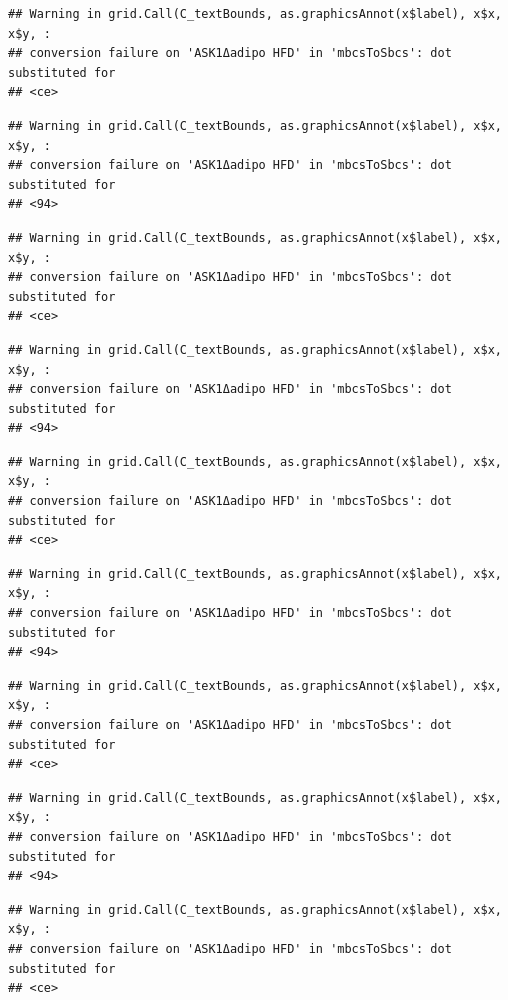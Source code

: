 \documentclass[]{book}
\begin{document}
\begin{verbatim}
## Warning in grid.Call(C_textBounds, as.graphicsAnnot(x$label), x$x, x$y, :
## conversion failure on 'ASK1Δadipo HFD' in 'mbcsToSbcs': dot substituted for
## <ce>
\end{verbatim}

\begin{verbatim}
## Warning in grid.Call(C_textBounds, as.graphicsAnnot(x$label), x$x, x$y, :
## conversion failure on 'ASK1Δadipo HFD' in 'mbcsToSbcs': dot substituted for
## <94>
\end{verbatim}

\begin{verbatim}
## Warning in grid.Call(C_textBounds, as.graphicsAnnot(x$label), x$x, x$y, :
## conversion failure on 'ASK1Δadipo HFD' in 'mbcsToSbcs': dot substituted for
## <ce>
\end{verbatim}

\begin{verbatim}
## Warning in grid.Call(C_textBounds, as.graphicsAnnot(x$label), x$x, x$y, :
## conversion failure on 'ASK1Δadipo HFD' in 'mbcsToSbcs': dot substituted for
## <94>
\end{verbatim}

\begin{verbatim}
## Warning in grid.Call(C_textBounds, as.graphicsAnnot(x$label), x$x, x$y, :
## conversion failure on 'ASK1Δadipo HFD' in 'mbcsToSbcs': dot substituted for
## <ce>
\end{verbatim}

\begin{verbatim}
## Warning in grid.Call(C_textBounds, as.graphicsAnnot(x$label), x$x, x$y, :
## conversion failure on 'ASK1Δadipo HFD' in 'mbcsToSbcs': dot substituted for
## <94>
\end{verbatim}

\begin{verbatim}
## Warning in grid.Call(C_textBounds, as.graphicsAnnot(x$label), x$x, x$y, :
## conversion failure on 'ASK1Δadipo HFD' in 'mbcsToSbcs': dot substituted for
## <ce>
\end{verbatim}

\begin{verbatim}
## Warning in grid.Call(C_textBounds, as.graphicsAnnot(x$label), x$x, x$y, :
## conversion failure on 'ASK1Δadipo HFD' in 'mbcsToSbcs': dot substituted for
## <94>
\end{verbatim}

\begin{verbatim}
## Warning in grid.Call(C_textBounds, as.graphicsAnnot(x$label), x$x, x$y, :
## conversion failure on 'ASK1Δadipo HFD' in 'mbcsToSbcs': dot substituted for
## <ce>
\end{verbatim}
\end{document}
